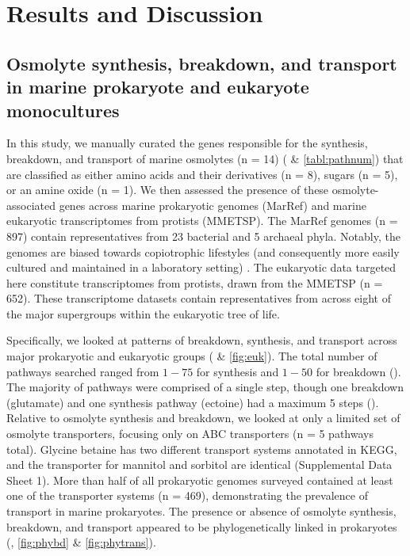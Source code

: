 \documentclass[utf8]{frontiersSCNS} %
\begin{document}
\section{Results and Discussion}

\subsection{Osmolyte synthesis, breakdown, and transport in marine prokaryote and eukaryote monocultures}

In this study, we manually curated the genes responsible for the synthesis, breakdown, and transport of marine osmolytes (n = 14) ( \& \ref{tabl:pathnum}) that are classified as either amino acids and their derivatives (n = 8), sugars (n = 5), or an amine oxide (n = 1). We then assessed the presence of these osmolyte-associated genes across marine prokaryotic genomes (MarRef) and marine eukaryotic transcriptomes from protists (MMETSP). The MarRef genomes (n = 897) contain representatives from 23 bacterial and 5 archaeal phyla. Notably, the genomes are biased towards copiotrophic lifestyles (and consequently more easily cultured and maintained in a laboratory setting) \citep{Pachiadaki_2019}. The eukaryotic data targeted here constitute transcriptomes from protists, drawn from the MMETSP (n = 652). These transcriptome datasets contain representatives from across eight of the major supergroups within the eukaryotic tree of life.

Specifically, we looked at patterns of breakdown, synthesis, and transport across major prokaryotic and eukaryotic groups ( \& \ref{fig:euk}). The total number of pathways searched ranged from $1 - 75$ for synthesis and $1 - 50$ for breakdown (). The majority of pathways were comprised of a single step, though one breakdown (glutamate) and one synthesis pathway (ectoine) had a maximum 5 steps (). Relative to osmolyte synthesis and breakdown, we looked at only a limited set of osmolyte transporters, focusing only on ABC transporters (n = 5 pathways total). Glycine betaine has two different transport systems annotated in KEGG, and the transporter for mannitol and sorbitol are identical (Supplemental Data Sheet 1). More than half of all prokaryotic genomes surveyed contained at least one of the transporter systems (n = 469), demonstrating the prevalence of transport in marine prokaryotes. The presence or absence of osmolyte synthesis, breakdown, and transport appeared to be phylogenetically linked in prokaryotes (, \ref{fig:phybd} \& \ref{fig:phytrans}).
\end{document}
